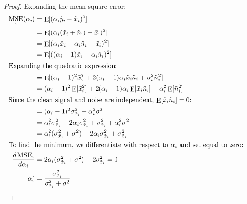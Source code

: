 \documentclass[12pt]{article}
\DeclareMathOperator{\E}{E}
\DeclareMathOperator{\MSE}{MSE}
\theoremstyle{definition}
\begin{document}
\begin{proof}
    Expanding the mean square error:
    \begin{align}
        \MSE_i(\alpha_i)
         & = \E[(\alpha_i \tilde{y}_i - \tilde{x}_i)^2]                                                                              \\
         & = \E[(\alpha_i(\tilde{x}_i + \tilde{n}_i) - \tilde{x}_i)^2]                                                               \\
         & = \E[(\alpha_i \tilde{x}_i + \alpha_i \tilde{n}_i - \tilde{x}_i)^2]                                                       \\
         & = \E[((\alpha_i - 1)\tilde{x}_i + \alpha_i \tilde{n}_i)^2]                                                                \\
        \intertext{Expanding the quadratic expression:}
         & = \E[(\alpha_i - 1)^2 \tilde{x}_i^2 + 2(\alpha_i - 1)\alpha_i \tilde{x}_i \tilde{n}_i + \alpha_i^2 \tilde{n}_i^2]         \\
         & = (\alpha_i - 1)^2 \E[\tilde{x}_i^2] + 2(\alpha_i - 1)\alpha_i \E[\tilde{x}_i \tilde{n}_i] + \alpha_i^2 \E[\tilde{n}_i^2] \\
        \intertext{Since the clean signal and noise are independent, $\E[\tilde{x}_i \tilde{n}_i] = 0$:}
         & = (\alpha_i - 1)^2 \sigma_{\tilde{x}_i}^2 + \alpha_i^2 \sigma^2                                                           \\
         & = \alpha_i^2 \sigma_{\tilde{x}_i}^2 - 2\alpha_i \sigma_{\tilde{x}_i}^2 + \sigma_{\tilde{x}_i}^2 + \alpha_i^2 \sigma^2     \\
         & = \alpha_i^2(\sigma_{\tilde{x}_i}^2 + \sigma^2) - 2\alpha_i \sigma_{\tilde{x}_i}^2 + \sigma_{\tilde{x}_i}^2               \\
        \intertext{To find the minimum, we differentiate with respect to $\alpha_i$ and set equal to zero:}
        \frac{d\MSE_i}{d\alpha_i}
         & = 2\alpha_i(\sigma_{\tilde{x}_i}^2 + \sigma^2) - 2\sigma_{\tilde{x}_i}^2 = 0                                              \\
        \alpha_i^*
         & = \frac{\sigma_{\tilde{x}_i}^2}{\sigma_{\tilde{x}_i}^2 + \sigma^2}
    \end{align}
\end{proof}

\newpage

\end{document}
